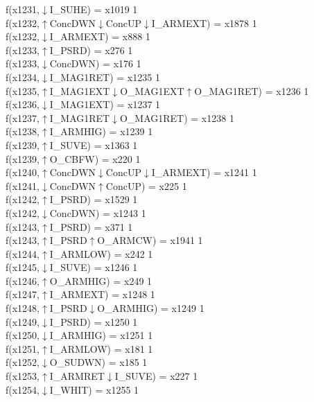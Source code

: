 f(x1231,$\downarrow$I\_SUHE) = x1019 {1} \\
f(x1232,$\uparrow$ConcDWN$\downarrow$ConcUP$\downarrow$I\_ARMEXT) = x1878 {1} \\
f(x1232,$\downarrow$I\_ARMEXT) = x888 {1} \\
f(x1233,$\uparrow$I\_PSRD) = x276 {1} \\
f(x1233,$\downarrow$ConcDWN) = x176 {1} \\
f(x1234,$\downarrow$I\_MAG1RET) = x1235 {1} \\
f(x1235,$\uparrow$I\_MAG1EXT$\downarrow$O\_MAG1EXT$\uparrow$O\_MAG1RET) = x1236 {1} \\
f(x1236,$\downarrow$I\_MAG1EXT) = x1237 {1} \\
f(x1237,$\uparrow$I\_MAG1RET$\downarrow$O\_MAG1RET) = x1238 {1} \\
f(x1238,$\uparrow$I\_ARMHIG) = x1239 {1} \\
f(x1239,$\uparrow$I\_SUVE) = x1363 {1} \\
f(x1239,$\uparrow$O\_CBFW) = x220 {1} \\
f(x1240,$\uparrow$ConcDWN$\downarrow$ConcUP$\downarrow$I\_ARMEXT) = x1241 {1} \\
f(x1241,$\downarrow$ConcDWN$\uparrow$ConcUP) = x225 {1} \\
f(x1242,$\uparrow$I\_PSRD) = x1529 {1} \\
f(x1242,$\downarrow$ConcDWN) = x1243 {1} \\
f(x1243,$\uparrow$I\_PSRD) = x371 {1} \\
f(x1243,$\uparrow$I\_PSRD$\uparrow$O\_ARMCW) = x1941 {1} \\
f(x1244,$\uparrow$I\_ARMLOW) = x242 {1} \\
f(x1245,$\downarrow$I\_SUVE) = x1246 {1} \\
f(x1246,$\uparrow$O\_ARMHIG) = x249 {1} \\
f(x1247,$\uparrow$I\_ARMEXT) = x1248 {1} \\
f(x1248,$\uparrow$I\_PSRD$\downarrow$O\_ARMHIG) = x1249 {1} \\
f(x1249,$\downarrow$I\_PSRD) = x1250 {1} \\
f(x1250,$\downarrow$I\_ARMHIG) = x1251 {1} \\
f(x1251,$\uparrow$I\_ARMLOW) = x181 {1} \\
f(x1252,$\downarrow$O\_SUDWN) = x185 {1} \\
f(x1253,$\uparrow$I\_ARMRET$\downarrow$I\_SUVE) = x227 {1} \\
f(x1254,$\downarrow$I\_WHIT) = x1255 {1} \\
